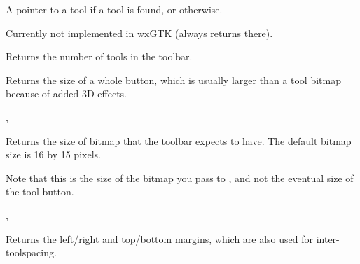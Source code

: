 
A pointer to a tool if a tool is found, or \NULL otherwise.


Currently not implemented in wxGTK (always returns \NULL there).


\label{wxtoolbargettoolscount}


Returns the number of tools in the toolbar.


\label{wxtoolbargettoolsize}


Returns the size of a whole button, which is usually larger than a tool bitmap because
of added 3D effects.


,\rtfsp
{}


\label{wxtoolbargettoolbitmapsize}


Returns the size of bitmap that the toolbar expects to have. The default bitmap size is 16 by 15 pixels.


Note that this is the size of the bitmap you pass to ,
and not the eventual size of the tool button.


,\rtfsp
{}


\label{wxtoolbargetmargins}


Returns the left/right and top/bottom margins, which are also used for inter-toolspacing.




\label{wxtoolbargettoolclientdata}

